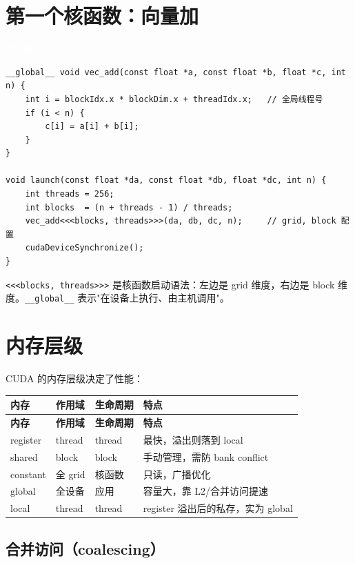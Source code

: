 \documentclass[12pt,a4paper,fontset=fandol]{ctexbook}
\newcommand{\cudalabel}{%
  \begin{tcolorbox}[enhanced,colback=cudaheadbg,colframe=cudaheadbg,
    arc=1mm,boxrule=0mm,left=6pt,right=6pt,top=2pt,bottom=2pt,
    halign=left,oversize]
    \textcolor{white}{\small\bfseries CUDA}
  \end{tcolorbox}\vspace{-4pt}}
\begin{document}
\section{第一个核函数：向量加}\label{sec:vecadd}

\cudalabel
\begin{lstlisting}[style=cudastyle]
__global__ void vec_add(const float *a, const float *b, float *c, int n) {
    int i = blockIdx.x * blockDim.x + threadIdx.x;   // 全局线程号
    if (i < n) {
        c[i] = a[i] + b[i];
    }
}

void launch(const float *da, const float *db, float *dc, int n) {
    int threads = 256;
    int blocks  = (n + threads - 1) / threads;
    vec_add<<<blocks, threads>>>(da, db, dc, n);     // grid, block 配置
    cudaDeviceSynchronize();
}
\end{lstlisting}

\texttt{<<<blocks, threads>>>} 是核函数启动语法：左边是 grid 维度，右边是 block 维度。\texttt{\_\_global\_\_} 表示"在设备上执行、由主机调用"。

\section{内存层级}\label{sec:cuda-mem}

CUDA 的内存层级决定了性能：

\begin{longtable}{p{2.8cm}p{3.4cm}p{3.4cm}p{4.6cm}}
\toprule
\textbf{内存} & \textbf{作用域} & \textbf{生命周期} & \textbf{特点} \\
\midrule
\endfirsthead
\toprule
\textbf{内存} & \textbf{作用域} & \textbf{生命周期} & \textbf{特点} \\
\midrule
\endhead
register   & thread & thread & 最快，溢出则落到 local \\
shared     & block  & block  & 手动管理，需防 bank conflict \\
constant   & 全 grid & 核函数 & 只读，广播优化 \\
global     & 全设备 & 应用   & 容量大，靠 L2/合并访问提速 \\
local      & thread & thread & register 溢出后的私存，实为 global \\
\bottomrule
\end{longtable}

\subsection{合并访问（coalescing）}
\end{document}
